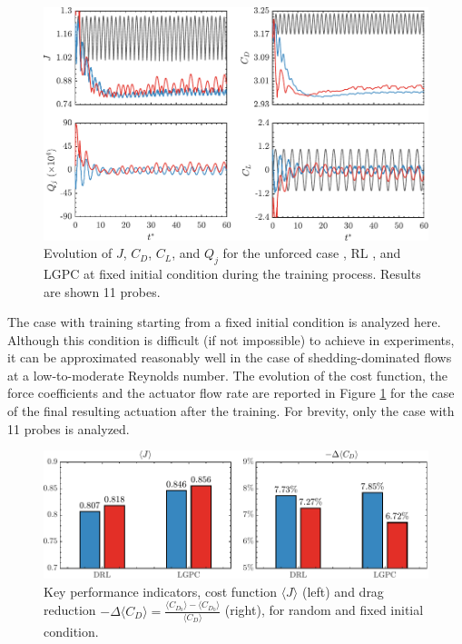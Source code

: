 \begin{figure}[tb]
    \centering
    \includegraphics[width=0.99\linewidth]{Figures/11_v2.pdf}
    \caption{Evolution of $J$, $C_D$, $C_L$, and $Q_j$ for the unforced case , RL , and LGPC  at fixed initial condition during the training process. Results are shown 11 probes.}
    \label{fig:Clean_fIC}
\end{figure}

The case with training starting from a fixed initial condition is analyzed here. Although this condition is difficult (if not impossible) to achieve in experiments, it can be approximated reasonably well in the case of shedding-dominated flows at a low-to-moderate Reynolds number. The evolution of the cost function, the force coefficients and the actuator flow rate are reported in Figure \ref{fig:Clean_fIC} for the case of the final resulting actuation after the training. For brevity, only the case with 11 probes is analyzed.

\begin{figure}[tb]
    \centering
    \includegraphics[width=0.95\linewidth]{Figures/12.pdf}
    \caption{Key performance indicators, cost function $\langle J \rangle$ (left) and drag reduction $-\Delta \langle C_D \rangle = \frac{\langle C_{D_0} \rangle - \langle C_{D_0} \rangle}{\langle C_{D} \rangle}$ (right), for random  and fixed  initial condition.}
    \label{fig:barplot}
\end{figure}

